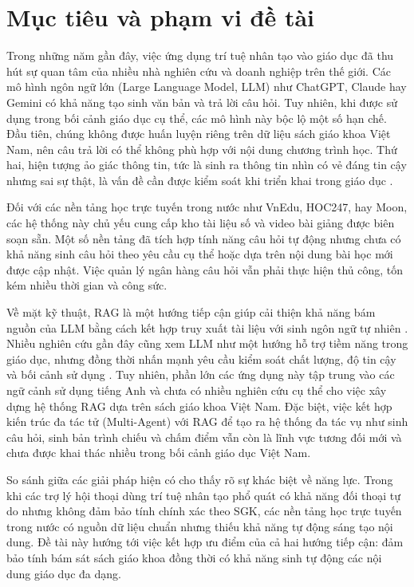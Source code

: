 \documentclass[../DoAn.tex]{subfiles}
\begin{document}
\section{Mục tiêu và phạm vi đề tài}
\label{section:1.2}

Trong những năm gần đây, việc ứng dụng trí tuệ nhân tạo vào giáo dục đã thu hút sự quan tâm của nhiều nhà nghiên cứu và doanh nghiệp trên thế giới. Các mô hình ngôn ngữ lớn (Large Language Model, LLM) như ChatGPT, Claude hay Gemini có khả năng tạo sinh văn bản và trả lời câu hỏi. Tuy nhiên, khi được sử dụng trong bối cảnh giáo dục cụ thể, các mô hình này bộc lộ một số hạn chế. Đầu tiên, chúng không được huấn luyện riêng trên dữ liệu sách giáo khoa Việt Nam, nên câu trả lời có thể không phù hợp với nội dung chương trình học. Thứ hai, hiện tượng ảo giác thông tin, tức là sinh ra thông tin nhìn có vẻ đáng tin cậy nhưng sai sự thật, là vấn đề cần được kiểm soát khi triển khai trong giáo dục \cite{ji2023hallucination,yan2024llm_edu}.

Đối với các nền tảng học trực tuyến trong nước như VnEdu, HOC247, hay Moon, các hệ thống này chủ yếu cung cấp kho tài liệu số và video bài giảng được biên soạn sẵn. Một số nền tảng đã tích hợp tính năng câu hỏi tự động nhưng chưa có khả năng sinh câu hỏi theo yêu cầu cụ thể hoặc dựa trên nội dung bài học mới được cập nhật. Việc quản lý ngân hàng câu hỏi vẫn phải thực hiện thủ công, tốn kém nhiều thời gian và công sức.

Về mặt kỹ thuật, RAG là một hướng tiếp cận giúp cải thiện khả năng bám nguồn của LLM bằng cách kết hợp truy xuất tài liệu với sinh ngôn ngữ tự nhiên \cite{lewis2020rag}. Nhiều nghiên cứu gần đây cũng xem LLM như một hướng hỗ trợ tiềm năng trong giáo dục, nhưng đồng thời nhấn mạnh yêu cầu kiểm soát chất lượng, độ tin cậy và bối cảnh sử dụng \cite{wang2024llmeducation,yan2024llm_edu}. Tuy nhiên, phần lớn các ứng dụng này tập trung vào các ngữ cảnh sử dụng tiếng Anh và chưa có nhiều nghiên cứu cụ thể cho việc xây dựng hệ thống RAG dựa trên sách giáo khoa Việt Nam. Đặc biệt, việc kết hợp kiến trúc đa tác tử (Multi-Agent) với RAG để tạo ra hệ thống đa tác vụ như sinh câu hỏi, sinh bản trình chiếu và chấm điểm vẫn còn là lĩnh vực tương đối mới và chưa được khai thác nhiều trong bối cảnh giáo dục Việt Nam.

So sánh giữa các giải pháp hiện có cho thấy rõ sự khác biệt về năng lực. Trong khi các trợ lý hội thoại dùng trí tuệ nhân tạo phổ quát có khả năng đối thoại tự do nhưng không đảm bảo tính chính xác theo SGK, các nền tảng học trực tuyến trong nước có nguồn dữ liệu chuẩn nhưng thiếu khả năng tự động sáng tạo nội dung. Đề tài này hướng tới việc kết hợp ưu điểm của cả hai hướng tiếp cận: đảm bảo tính bám sát sách giáo khoa đồng thời có khả năng sinh tự động các nội dung giáo dục đa dạng.
\end{document}
